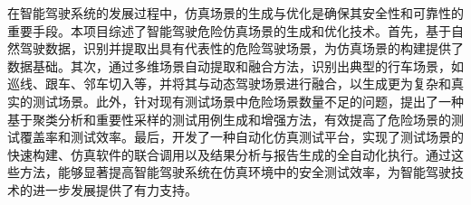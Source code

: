 \begin{abstractzh}


在智能驾驶系统的发展过程中，仿真场景的生成与优化是确保其安全性和可靠性的重要手段。本项目综述了智能驾驶危险仿真场景的生成和优化技术。首先，基于自然驾驶数据，识别并提取出具有代表性的危险驾驶场景，为仿真场景的构建提供了数据基础。其次，通过多维场景自动提取和融合方法，识别出典型的行车场景，如巡线、跟车、邻车切入等，并将其与动态驾驶场景进行融合，以生成更为复杂和真实的测试场景。此外，针对现有测试场景中危险场景数量不足的问题，提出了一种基于聚类分析和重要性采样的测试用例生成和增强方法，有效提高了危险场景的测试覆盖率和测试效率。最后，开发了一种自动化仿真测试平台，实现了测试场景的快速构建、仿真软件的联合调用以及结果分析与报告生成的全自动化执行。通过这些方法，能够显著提高智能驾驶系统在仿真环境中的安全测试效率，为智能驾驶技术的进一步发展提供了有力支持。


\end{abstractzh}
